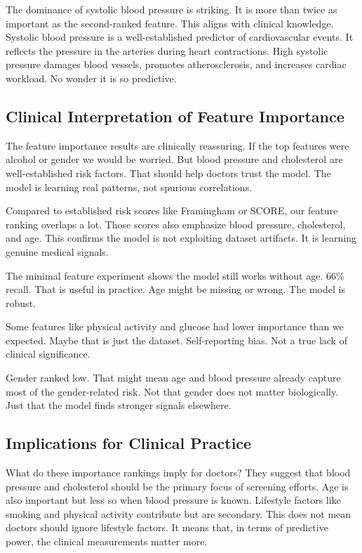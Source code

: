 \documentclass[12pt, a4paper, oneside]{book}
\begin{document}
The dominance of systolic blood pressure is striking. It is more than twice as important as the second-ranked feature. This aligns with clinical knowledge. Systolic blood pressure is a well-established predictor of cardiovascular events. It reflects the pressure in the arteries during heart contractions. High systolic pressure damages blood vessels, promotes atherosclerosis, and increases cardiac workload. No wonder it is so predictive.

\subsection{Clinical Interpretation of Feature Importance}
The feature importance results are clinically reassuring. If the top features were alcohol or gender we would be worried. But blood pressure and cholesterol are well-established risk factors. That should help doctors trust the model. The model is learning real patterns, not spurious correlations.

Compared to established risk scores like Framingham or SCORE, our feature ranking overlaps a lot. Those scores also emphasize blood pressure, cholesterol, and age. This confirms the model is not exploiting dataset artifacts. It is learning genuine medical signals.

The minimal feature experiment shows the model still works without age. 66\% recall. That is useful in practice. Age might be missing or wrong. The model is robust.

Some features like physical activity and glucose had lower importance than we expected. Maybe that is just the dataset. Self-reporting bias. Not a true lack of clinical significance.

Gender ranked low. That might mean age and blood pressure already capture most of the gender-related risk. Not that gender does not matter biologically. Just that the model finds stronger signals elsewhere.

\subsection{Implications for Clinical Practice}
What do these importance rankings imply for doctors? They suggest that blood pressure and cholesterol should be the primary focus of screening efforts. Age is also important but less so when blood pressure is known. Lifestyle factors like smoking and physical activity contribute but are secondary. This does not mean doctors should ignore lifestyle factors. It means that, in terms of predictive power, the clinical measurements matter more.
\end{document}
